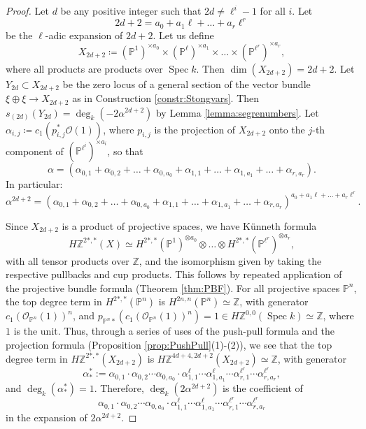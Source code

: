 \documentclass[10pt]{amsart}
\theoremstyle{definition}
\theoremstyle{plain}
\numberwithin{equation}{section}
\newcommand{\0}{\emptyset}
\renewcommand{\P}{{\mathbb P}}
\newcommand{\Z}{{\mathbb Z}}
\newcommand{\Spec}{{\operatorname{Spec}}}
\renewcommand{\deg}{{\operatorname{deg}}}
\renewcommand{\dim}{{\operatorname{dim}}}
\begin{document}
\begin{proof}
    
Let $d$ be any positive integer such that $2d \neq \ell^i-1$ for all $i$. Let
$$2d+2= a_0 +a_1\ell + \ldots +a_r \ell^r$$
be the $\ell$-adic expansion of $2d+2$. Let us define
$$X_{2d+2} \coloneqq (\mathbb{P}^1)^{\times a_0} \times (\mathbb{P}^{\ell})^{\times a_1} \times \ldots \times (\mathbb{P}^{\ell^r})^{\times a_r},$$
where all products are products over $\Spec k$. Then $\dim(X_{2d+2})=2d+2$. Let $Y_{2d} \subset X_{2d+2}$ be the zero locus of a general section of the vector bundle $\xi \oplus \xi \to X_{2d+2}$ as in Construction \ref{constr:Stongvars}. Then $s_{(2d)}(Y_{2d})=\deg_k (-2\alpha^{2d+2})$ by Lemma \ref{lemma:segrenumbers}. 
Let $\alpha_{i,j}\coloneqq c_1(p_{i,j}^*\mathcal{O}(1))$, where $p_{i,j}$ is the projection of $X_{2d+2}$ onto the $j$-th component of $(\mathbb{P}^{\ell^i})^{\times a_i}$, so that 
$$\alpha=(\alpha_{0,1}+\alpha_{0,2}+\ldots +\alpha_{0,a_0}+\alpha_{1,1}+\ldots + \alpha_{1,a_1}+\ldots +\alpha_{r,a_r}).$$
In particular:
$$\alpha^{2d+2}=(\alpha_{0,1}+\alpha_{0,2}+\ldots +\alpha_{0,a_0}+\alpha_{1,1}+\ldots + \alpha_{1,a_1}+\ldots +\alpha_{r,a_r})^{a_0 +a_1\ell +\ldots +a_r \ell^r}.$$

Since $X_{2d+2}$ is a product of projective spaces, we have K\"unneth formula
$$H\Z^{2*, *}(X)\simeq H^{2*,*}(\P^1)^{\otimes a_0}\otimes\ldots\otimes H^{2*,*}(\P^{\ell^r})^{\otimes a_r},$$
with all tensor products over $\Z$, and the isomorphism given by taking the respective pullbacks and cup products. This follows by repeated application of the projective bundle formula (Theorem \ref{thm:PBF}). For all projective spaces $\P^n$, the top degree term in $H^{2*,*}(\P^n)$ is $H^{2n,n}(\P^n)\simeq \Z$, with generator $c_1(\mathcal{O}_{\P^n}(1))^n$, and $p_{\P^n*}(c_1(\mathcal{O}_{\P^n}(1))^n)=1\in H\Z^{0,0}(\Spec k)\simeq \Z$, where $1$ is the unit. Thus, through a series of uses of the push-pull formula and the projection formula (Proposition \ref{prop:PushPull}(1)-(2)), we see that the top degree term in $H\Z^{2*, *}(X_{2d+2})$ is $H\Z^{4d+4, 2d+2}(X_{2d+2})\simeq \Z$, with generator 
\[
\alpha_*^*:=\alpha_{0,1} \cdot\alpha_{0,2}\cdots\alpha_{0,a_0} \cdot \alpha_{1,1}^{\ell} \cdots \alpha_{1,a_1}^{\ell} \cdots \alpha_{r,1}^{\ell^r} \cdots \alpha_{r,a_r}^{\ell^r},
\]
and $\deg_k(\alpha_*^*)=1$. Therefore, $\deg_k(2\alpha^{2d+2})$ is the coefficient of 
$$\alpha_{0,1} \cdot \alpha_{0,2}\cdots\alpha_{0,a_0} \cdot \alpha_{1,1}^{\ell} \cdots \alpha_{1,a_1}^{\ell} \cdots \alpha_{r,1}^{\ell^r} \cdots \alpha_{r,a_r}^{\ell^r}$$
in the expansion of $2\alpha^{2d+2}$.


\end{proof}
\end{document}
